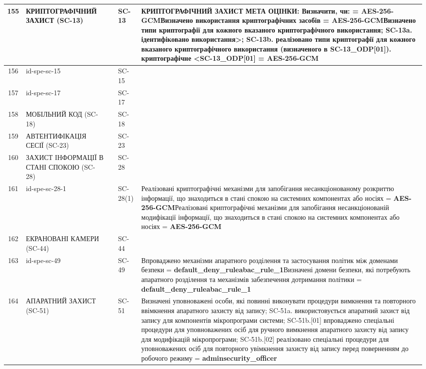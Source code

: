 \documentclass[10pt]{article}
\begin{document}
\begin{longtable}{|c|>{\raggedright\arraybackslash}p{4cm}|>{\raggedright\arraybackslash}p{2.5cm}|>{\raggedright\arraybackslash}p{3.5cm}|>{\raggedright\arraybackslash}p{5.5cm}|}
155 & КРИПТОГРАФІЧНИЙ ЗАХИСТ (SC-13) &  & SC-13 & КРИПТОГРАФІЧНИЙ ЗАХИСТ МЕТА ОЦІНКИ: Визначити, чи: = \textbf{AES-256-GCM}\newline Визначено використання криптографічних засобів = \textbf{AES-256-GCM}\newline Визначено типи криптографії для кожного вказаного криптографічного використання; SC-13a. ідентифіковано використання>; SC-13b. реалізовано типи криптографії для кожного вказаного криптографічного використання (визначеного в SC-13\_\allowbreak{}ODP[01]). криптографічне <SC-13\_\allowbreak{}ODP[01] = \textbf{AES-256-GCM} \\ \hline
156 & id-spe-sc-15 &  & SC-15 &  \\ \hline
157 & id-spe-sc-17 &  & SC-17 &  \\ \hline
158 & МОБІЛЬНИЙ КОД (SC-18) &  & SC-18 &  \\ \hline
159 & АВТЕНТИФІКАЦІЯ СЕСІЇ (SC-23) &  & SC-23 &  \\ \hline
160 & ЗАХИСТ ІНФОРМАЦІЇ В СТАНІ СПОКОЮ (SC-28) &  & SC-28 &  \\ \hline
161 & id-spe-sc-28-1 &  & SC-28(1) & Реалізовані криптографічні механізми для запобігання несанкціонованому розкриттю інформації, що знаходиться в стані спокою на системних компонентах або носіях = \textbf{AES-256-GCM}\newline Реалізовані криптографічні механізми для запобігання несанкціонованій модифікації інформації, що знаходиться в стані спокою на системних компонентах або носіях = \textbf{AES-256-GCM} \\ \hline
162 & ЕКРАНОВАНІ КАМЕРИ (SC-44) &  & SC-44 &  \\ \hline
163 & id-spe-sc-49 &  & SC-49 & Впроваджено механізми апаратного розділення та застосування політик між доменами безпеки = \textbf{default\_\allowbreak{}deny\_\allowbreak{}ruleabac\_\allowbreak{}rule\_\allowbreak{}1}\newline Визначені домени безпеки, які потребують апаратного розділення та механізмів забезпечення дотримання політики = \textbf{default\_\allowbreak{}deny\_\allowbreak{}ruleabac\_\allowbreak{}rule\_\allowbreak{}1} \\ \hline
164 & АПАРАТНИЙ ЗАХИСТ (SC-51) &  & SC-51 & Визначені уповноважені особи, які повинні виконувати процедури вимкнення та повторного ввімкнення апаратного захисту від запису; SC-51a. використовується апаратний захист від запису для компонентів мікропрограми системи; SC-51b.[01] впроваджено спеціальні процедури для уповноважених осіб для ручного вимкнення апаратного захисту від запису для модифікацій мікропрограми; SC-51b.[02] реалізовано спеціальні процедури для уповноважених осіб для повторного увімкнення захисту від запису перед поверненням до робочого режиму = \textbf{adminsecurity\_\allowbreak{}officer} \\ \hline

\end{longtable}
\end{document}
